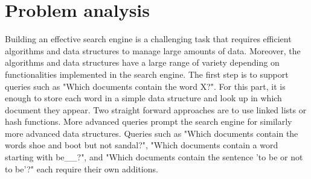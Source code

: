 \section{Problem analysis}

Building an effective search engine is a challenging task that requires efficient algorithms and data structures to manage large amounts of data. Moreover, the algorithms and data structures have a large range of variety depending on functionalities implemented in the search engine. The first step is to support queries such as "Which documents contain the word X?". For this part, it is enough to store each word in a simple data structure and look up in which document they appear. Two straight forward approaches are to use linked lists or hash functions. More advanced queries prompt the search engine for similarly more advanced data structures. Queries such as "Which documents contain the words shoe and boot but not sandal?", "Which documents contain a word starting with be\_\_?", and "Which documents contain the sentence 'to be or not to be'?" each require their own additions. 
